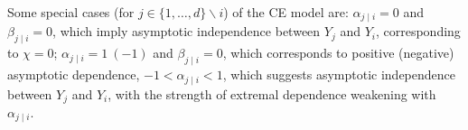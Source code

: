 \documentclass[12pt,compact]{article}
\begin{document}
Some special cases (for $j\in\{1,\ldots,d\} \backslash i$) of the CE model are:
$\alpha_{j\mid i}=0$ and $\beta_{j\mid i}=0$, which imply asymptotic independence between $Y_j$ and $Y_i$, corresponding to $\chi=0$;
$\alpha_{j\mid i}=1\ ( -1)$ and $\beta_{j\mid i}=0$, which corresponds to positive (negative) asymptotic dependence, %
$-1<\alpha_{j\mid i}<1$, which suggests asymptotic independence between $Y_j$ and $Y_i$, with the strength of extremal dependence weakening with $\alpha_{j \mid i}$. %

\end{document}
